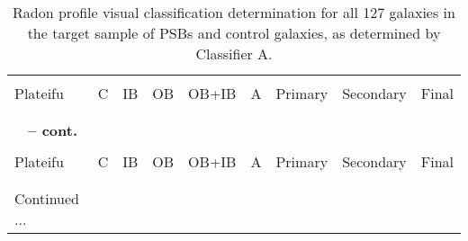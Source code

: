 \begin{longtable}{p{2.1cm}p{0.8cm}p{0.8cm}p{0.8cm}p{0.8cm}p{0.8cm}p{1.5cm}p{1.5cm}p{1.2cm}}
\caption[Radon profile visual classification of PSBs and controls - Classifier A]{Radon profile visual classification determination for all 127 galaxies in the target sample of PSBs and control galaxies, as determined by Classifier A.}
\label{tab:full-visual-classification} \\

\hline
\\
Plateifu & C & IB & OB & OB+IB & A & Primary & Secondary & Final \\
\\
\hline
\\
\endfirsthead
%
{{\bfseries \tablename\ \thetable{} -- cont.}}
\\
\hline
\\
Plateifu & C & IB & OB & OB+IB & A & Primary & Secondary & Final \\
\\
\hline
\\
\endhead

\hline 
{{Continued ...}}
\endfoot
\hline
\endlastfoot


\end{longtable}
